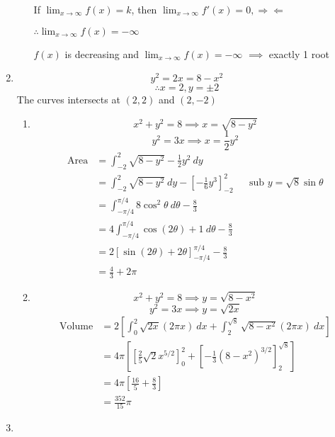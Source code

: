 \documentclass[12pt]{article}
\theoremstyle{definition}
\begin{document}
\begin{enumerate}
\begin{enumerate}[label=(\alph*)]
                If $\lim_{x\to \infty}f(x)=k$, then $\lim_{x\to \infty}f'(x)=0,\Rightarrow\!\Leftarrow$
                
                $\therefore \lim_{x\to \infty}f(x)=-\infty$
                
                $f(x)$ is decreasing and $\lim_{x\to \infty}f(x)=-\infty$ $\implies$ exactly 1 root
        \end{enumerate}
  \item \[y^2 = 2x = 8 - x^2\]
        \[\therefore x=2,y=\pm 2\]
        The curves intersects at $(2,2)$ and $(2,-2)$
        \begin{enumerate}[label=(\roman*)]
          \item \[x^2+y^2=8 \implies x=\sqrt{8-y^2}\]
                \[y^2 = 3x \implies x=\frac{1}{2}y^2\]
                \begin{align*}
                  \text{Area} &= \int_{-2}^2 \sqrt{8-y^2}-\frac{1}{2}y^2\ dy \\
                    &= \int_{-2}^2 \sqrt{8-y^2}\ dy - \left[-\frac{1}{6}y^3\right]_{-2}^2 && \text{sub $y=\sqrt{8}\sin\theta$} \\
                    &= \int_{-\pi/4}^{\pi/4}8\cos^2\theta\ d\theta - \frac{8}{3} \\
                    &= 4\int_{-\pi/4}^{\pi/4} \cos(2\theta)+1\ d\theta - \frac{8}{3} \\
                    &= 2[\sin(2\theta)+2\theta]_{-\pi/4}^{\pi/4} - \frac{8}{3} \\
                    &= \frac{4}{3} + 2\pi 
                \end{align*}
          \item \[x^2+y^2=8 \implies y=\sqrt{8-x^2}\]
                \[y^2 = 3x \implies y=\sqrt{2x}\]
                \begin{align*}
                  \text{Volume} &= 2\left[\int_0^2 \sqrt{2x}(2\pi x)\ dx + \int_2^{\sqrt{8}}\sqrt{8-x^2}(2\pi x)\ dx \right] \\
                    &= 4\pi\left[\left[\frac{2}{5}\sqrt{2}x^{5/2}\right]_0^2 + \left[-\frac{1}{3}(8-x^2)^{3/2} \right]_2^{\sqrt{8}} \right] \\
                    &= 4\pi\left[\frac{16}{5} + \frac{8}{3}\right] \\
                    &= \frac{352}{15}\pi
                \end{align*}
        \end{enumerate}
   \item \begin{enumerate}[label=(\roman*)]

\end{enumerate}
\end{enumerate}
\end{document}
